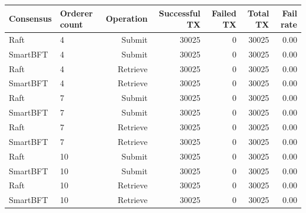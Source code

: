 \begin{tabular}{llrrrrr}
\hline
Consensus & Orderer count & Operation & Successful TX & Failed TX & Total TX & Fail rate \\
\hline
Raft & 4 & Submit & 30025 & 0 & 30025 & 0.00 \\
SmartBFT & 4 & Submit & 30025 & 0 & 30025 & 0.00 \\
Raft & 4 & Retrieve & 30025 & 0 & 30025 & 0.00 \\
SmartBFT & 4 & Retrieve & 30025 & 0 & 30025 & 0.00 \\
Raft & 7 & Submit & 30025 & 0 & 30025 & 0.00 \\
SmartBFT & 7 & Submit & 30025 & 0 & 30025 & 0.00 \\
Raft & 7 & Retrieve & 30025 & 0 & 30025 & 0.00 \\
SmartBFT & 7 & Retrieve & 30025 & 0 & 30025 & 0.00 \\
Raft & 10 & Submit & 30025 & 0 & 30025 & 0.00 \\
SmartBFT & 10 & Submit & 30025 & 0 & 30025 & 0.00 \\
Raft & 10 & Retrieve & 30025 & 0 & 30025 & 0.00 \\
SmartBFT & 10 & Retrieve & 30025 & 0 & 30025 & 0.00 \\
\hline
\end{tabular}